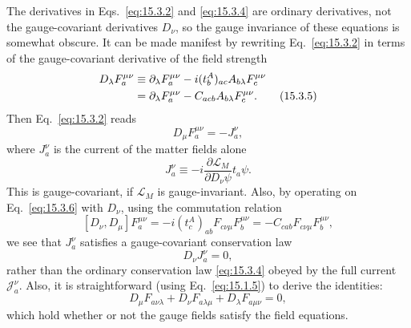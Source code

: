 The derivatives in Eqs.~\eqref{eq:15.3.2} and \eqref{eq:15.3.4} are ordinary
derivatives, not the gauge-covariant derivatives $D_\nu$, so the gauge invariance
of these equations is somewhat obscure. It can be made manifest by rewriting
Eq.~\eqref{eq:15.3.2} in terms of the gauge-covariant derivative of the field
strength
\begin{align}
 D_\lambda F_a^{\mu\nu}
 &\equiv\partial_\lambda F_a^{\mu\nu}
 -i(t^A_b)_{ac}A_{b\lambda}F_c^{\mu\nu}\notag\\
 &=\partial_\lambda F_a^{\mu\nu}
 -C_{acb}A_{b\lambda}F_c^{\mu\nu} .
 \tag{15.3.5}\label{eq:15.3.5}
\end{align}
Then Eq.~\eqref{eq:15.3.2} reads
\begin{equation}
 D_\mu F_a^{\mu\nu}=-J_a^\nu ,
 \tag{15.3.6}\label{eq:15.3.6}
\end{equation}
where $J_a^\nu$ is the current of the matter fields alone
\begin{equation}
 J_a^\nu\equiv-i\frac{\partial\mathcal L_M}{\partial D_\nu\psi}
 t_a\psi .
 \tag{15.3.7}\label{eq:15.3.7}
\end{equation}
This is gauge-covariant, if $\mathcal L_M$ is gauge-invariant. Also, by operating
on Eq.~\eqref{eq:15.3.6} with $D_\nu$, using the commutation relation
\[
 [D_\nu,D_\mu]F_a^{\mu\nu}
 =-i(t^A_c)_{ab}F_{c\nu\mu}F_b^{\mu\nu}
 =-C_{cab}F_{c\nu\mu}F_b^{\mu\nu} ,
\]
we see that $J_a^\nu$ satisfies a gauge-covariant conservation law
\begin{equation}
 D_\nu J_a^\nu=0 ,
 \tag{15.3.8}\label{eq:15.3.8}
\end{equation}
rather than the ordinary conservation law \eqref{eq:15.3.4} obeyed by the full
current $\mathcal J_a^\nu$. Also, it is straightforward (using
Eq.~\eqref{eq:15.1.5}) to derive the identities:
\begin{equation}
 D_\mu F_{a\nu\lambda}+D_\nu F_{a\lambda\mu}
 +D_\lambda F_{a\mu\nu}=0 ,
 \tag{15.3.9}\label{eq:15.3.9}
\end{equation}
which hold whether or not the gauge fields satisfy the field equations.

